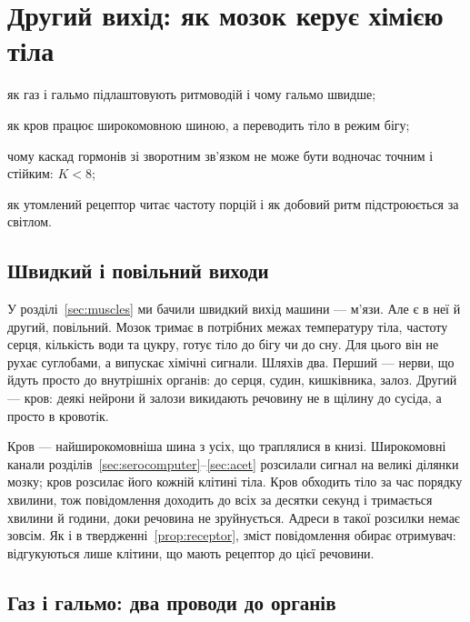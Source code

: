 \chapter{Другий вихід: як мозок керує хімією тіла}
\label{sec:chemoutput}
\begin{chaptergoals}
\item як газ  і гальмо  підлаштовують ритмоводій і чому гальмо швидше;
\item як кров працює широкомовною шиною, а  переводить тіло в режим бігу;
\item чому каскад гормонів зі зворотним зв'язком не може бути водночас точним і стійким: $K<8$;
\item як утомлений рецептор читає частоту порцій і як добовий ритм підстроюється за світлом.
\end{chaptergoals}

\section{Швидкий і повільний виходи}

У розділі~\ref{sec:muscles} ми бачили швидкий вихід машини --- м'язи. Але є в неї й другий, повільний. Мозок тримає в потрібних межах температуру тіла, частоту серця, кількість води та цукру, готує тіло до бігу чи до сну. Для цього він не рухає суглобами, а випускає хімічні сигнали. Шляхів два. Перший --- нерви, що йдуть просто до внутрішніх органів: до серця, судин, кишківника, залоз. Другий --- кров: деякі нейрони й залози викидають речовину не в щілину до сусіда, а просто в кровотік.

Кров --- найширокомовніша шина з усіх, що траплялися в книзі. Широкомовні канали розділів~\ref{sec:serocomputer}--\ref{sec:acet} розсилали сигнал на великі ділянки мозку; кров розсилає його кожній клітині тіла. Кров обходить тіло за час порядку хвилини, тож повідомлення доходить до всіх за десятки секунд і тримається хвилини й години, доки речовина не зруйнується. Адреси в такої розсилки немає зовсім. Як і в твердженні~\ref{prop:receptor}, зміст повідомлення обирає отримувач: відгукуються лише клітини, що мають рецептор до цієї речовини.

\section{Газ і гальмо: два проводи до органів}

